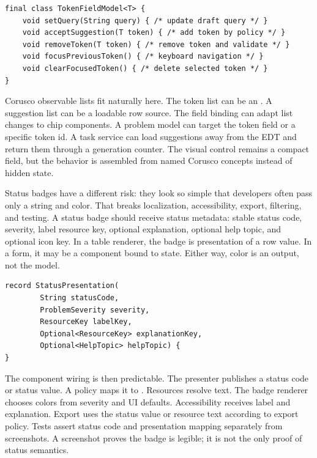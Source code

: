 \begin{lstlisting}[caption={Token field events update list state through named operations.}]
final class TokenFieldModel<T> {
    void setQuery(String query) { /* update draft query */ }
    void acceptSuggestion(T token) { /* add token by policy */ }
    void removeToken(T token) { /* remove token and validate */ }
    void focusPreviousToken() { /* keyboard navigation */ }
    void clearFocusedToken() { /* delete selected token */ }
}
\end{lstlisting}

Corusco observable lists fit naturally here. The token list can be an
. A suggestion list can be a loadable row source. The
field binding can adapt list changes to chip components. A problem model can target the
token field or a specific token id. A task service can load suggestions away from the
EDT and return them through a generation counter. The visual control remains a compact
field, but the behavior is assembled from named Corusco concepts instead of hidden
state.

Status badges have a different risk: they look so simple that developers often pass only
a string and color. That breaks localization, accessibility, export, filtering, and
testing. A status badge should receive status metadata: stable status code, severity,
label resource key, optional explanation, optional help topic, and optional icon key. In
a table renderer, the badge is presentation of a row value. In a form, it may be a
component bound to state. Either way, color is an output, not the model.

\begin{lstlisting}[caption={Status badge policy derives visuals from semantic state.}]
record StatusPresentation(
        String statusCode,
        ProblemSeverity severity,
        ResourceKey labelKey,
        Optional<ResourceKey> explanationKey,
        Optional<HelpTopic> helpTopic) {
}
\end{lstlisting}

The component wiring is then predictable. The presenter publishes a status code or
status value. A policy maps it to . Resources resolve text. The
badge renderer chooses colors from severity and UI defaults. Accessibility receives
label and explanation. Export uses the status value or resource text according to export
policy. Tests assert status code and presentation mapping separately from screenshots. A
screenshot proves the badge is legible; it is not the only proof of status semantics.

